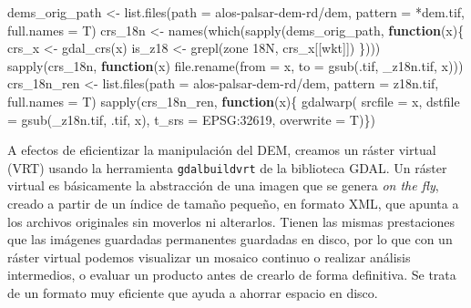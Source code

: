 \documentclass[spanish]{article}
\newenvironment{Shaded}{\begin{snugshade}}{\end{snugshade}}
\newcommand{\AttributeTok}[1]{\textcolor[rgb]{0.77,0.63,0.00}{#1}}
\newcommand{\ControlFlowTok}[1]{\textcolor[rgb]{0.13,0.29,0.53}{\textbf{#1}}}
\newcommand{\FunctionTok}[1]{\textcolor[rgb]{0.00,0.00,0.00}{#1}}
\newcommand{\NormalTok}[1]{#1}
\newcommand{\OtherTok}[1]{\textcolor[rgb]{0.56,0.35,0.01}{#1}}
\newcommand{\StringTok}[1]{\textcolor[rgb]{0.31,0.60,0.02}{#1}}
\begin{document}
\begin{Shaded}
\begin{Highlighting}[]
\NormalTok{dems\_orig\_path }\OtherTok{\textless{}{-}} \FunctionTok{list.files}\NormalTok{(}\AttributeTok{path =} \StringTok{\textquotesingle{}alos{-}palsar{-}dem{-}rd/dem\textquotesingle{}}\NormalTok{,}
                             \AttributeTok{pattern =} \StringTok{\textquotesingle{}*dem.tif\textquotesingle{}}\NormalTok{, }\AttributeTok{full.names =}\NormalTok{ T)}
\NormalTok{crs\_18n }\OtherTok{\textless{}{-}} \FunctionTok{names}\NormalTok{(}\FunctionTok{which}\NormalTok{(}\FunctionTok{sapply}\NormalTok{(dems\_orig\_path, }\ControlFlowTok{function}\NormalTok{(x)\{}
\NormalTok{  crs\_x }\OtherTok{\textless{}{-}} \FunctionTok{gdal\_crs}\NormalTok{(x)}
\NormalTok{  is\_z18 }\OtherTok{\textless{}{-}} \FunctionTok{grepl}\NormalTok{(}\StringTok{\textquotesingle{}zone 18N\textquotesingle{}}\NormalTok{, crs\_x[[}\StringTok{\textquotesingle{}wkt\textquotesingle{}}\NormalTok{]])}
\NormalTok{\})))}
\FunctionTok{sapply}\NormalTok{(crs\_18n, }\ControlFlowTok{function}\NormalTok{(x) }\FunctionTok{file.rename}\NormalTok{(}\AttributeTok{from =}\NormalTok{ x, }\AttributeTok{to =} \FunctionTok{gsub}\NormalTok{(}\StringTok{\textquotesingle{}.tif\textquotesingle{}}\NormalTok{, }\StringTok{\textquotesingle{}\_z18n.tif\textquotesingle{}}\NormalTok{, x)))}
\NormalTok{crs\_18n\_ren }\OtherTok{\textless{}{-}} \FunctionTok{list.files}\NormalTok{(}\AttributeTok{path =} \StringTok{\textquotesingle{}alos{-}palsar{-}dem{-}rd/dem\textquotesingle{}}\NormalTok{,}
                          \AttributeTok{pattern =} \StringTok{\textquotesingle{}z18n.tif\textquotesingle{}}\NormalTok{, }\AttributeTok{full.names =}\NormalTok{ T)}
\FunctionTok{sapply}\NormalTok{(crs\_18n\_ren, }\ControlFlowTok{function}\NormalTok{(x)\{}
  \FunctionTok{gdalwarp}\NormalTok{(}
  \AttributeTok{srcfile =}\NormalTok{ x,}
  \AttributeTok{dstfile =} \FunctionTok{gsub}\NormalTok{(}\StringTok{\textquotesingle{}\_z18n.tif\textquotesingle{}}\NormalTok{, }\StringTok{\textquotesingle{}.tif\textquotesingle{}}\NormalTok{, x), }
  \AttributeTok{t\_srs =} \StringTok{\textquotesingle{}EPSG:32619\textquotesingle{}}\NormalTok{, }\AttributeTok{overwrite =}\NormalTok{ T)\})}
\end{Highlighting}
\end{Shaded}

A efectos de eficientizar la manipulación del DEM, creamos un ráster
virtual (VRT) usando la herramienta \texttt{gdalbuildvrt} de la
biblioteca GDAL. Un ráster virtual es básicamente la abstracción de una
imagen que se genera \emph{on the fly}, creado a partir de un índice de
tamaño pequeño, en formato XML, que apunta a los archivos originales sin
moverlos ni alterarlos. Tienen las mismas prestaciones que las imágenes
guardadas permanentes guardadas en disco, por lo que con un ráster
virtual podemos visualizar un mosaico continuo o realizar análisis
intermedios, o evaluar un producto antes de crearlo de forma definitiva.
Se trata de un formato muy eficiente que ayuda a ahorrar espacio en
disco.
\end{document}
